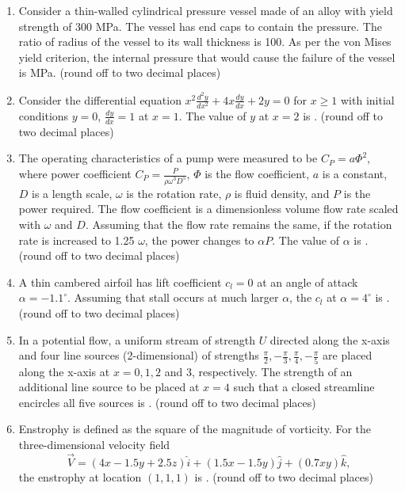 \documentclass{article}
\begin{document}
\begin{enumerate}[leftmargin=*, resume]
\item Consider a thin-walled cylindrical pressure vessel made of an alloy with yield strength of 300 MPa. The vessel has end caps to contain the pressure. The ratio of radius of the vessel to its wall thickness is 100. As per the von Mises yield criterion, the internal pressure that would cause the failure of the vessel is \underline{\hspace{1.5cm}} MPa. (round off to two decimal places)

\item Consider the differential equation $x^2 \frac{d^2y}{dx^2} + 4x \frac{dy}{dx} + 2y = 0$ for $x \geq 1$ with initial conditions $y = 0$, $\frac{dy}{dx} = 1$ at $x = 1$. The value of $y$ at $x = 2$ is \underline{\hspace{1.5cm}}. (round off to two decimal places)

\item The operating characteristics of a pump were measured to be $C_P = a \Phi^2$, where power coefficient $C_P = \frac{P}{\rho \omega^3 D^5}$, $\Phi$ is the flow coefficient, $a$ is a constant, $D$ is a length scale, $\omega$ is the rotation rate, $\rho$ is fluid density, and $P$ is the power required. The flow coefficient is a dimensionless volume flow rate scaled with $\omega$ and $D$. Assuming that the flow rate remains the same, if the rotation rate is increased to 1.25 $\omega$, the power changes to $\alpha P$. The value of $\alpha$ is \underline{\hspace{1.5cm}}. (round off to two decimal places)

\item A thin cambered airfoil has lift coefficient $c_l = 0$ at an angle of attack $\alpha = -1.1^\circ$. Assuming that stall occurs at much larger $\alpha$, the $c_l$ at $\alpha = 4^\circ$ is \underline{\hspace{1.5cm}}. (round off to two decimal places)

\item In a potential flow, a uniform stream of strength $U$ directed along the x-axis and four line sources (2-dimensional) of strengths $\frac{\pi}{2}, -\frac{\pi}{3}, \frac{\pi}{4}, -\frac{\pi}{5}$ are placed along the x-axis at $x = 0, 1, 2$ and 3, respectively. The strength of an additional line source to be placed at $x = 4$ such that a closed streamline encircles all five sources is \underline{\hspace{1.5cm}}. (round off to two decimal places)

\item Enstrophy is defined as the square of the magnitude of vorticity. For the three-dimensional velocity field
\[
\vec{V} = (4x - 1.5y + 2.5z)\hat{i} + (1.5x - 1.5y)\hat{j} + (0.7xy)\hat{k},
\]
the enstrophy at location $(1, 1, 1)$ is \underline{\hspace{1.5cm}}. (round off to two decimal places)


\end{enumerate}
\end{document}
